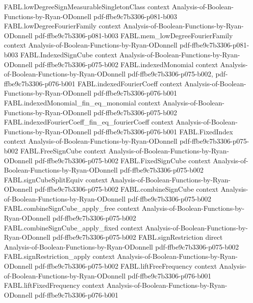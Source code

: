 \begin{theorem}
  {FABL.lowDegreeSignMeasurableSingletonClass}
  {context}
  {Analysis-of-Boolean-Functions-by-Ryan-ODonnell}
  {pdf-ffbe9c7b3306-p081-b003}
\proofstep
  {FABL.lowDegreeFourierFamily}
  {context}
  {Analysis-of-Boolean-Functions-by-Ryan-ODonnell}
  {pdf-ffbe9c7b3306-p081-b003}
\proofstep
  {FABL.mem_lowDegreeFourierFamily}
  {context}
  {Analysis-of-Boolean-Functions-by-Ryan-ODonnell}
  {pdf-ffbe9c7b3306-p081-b003}
\proofstep
  {FABL.IndexedSignCube}
  {context}
  {Analysis-of-Boolean-Functions-by-Ryan-ODonnell}
  {pdf-ffbe9c7b3306-p075-b002}
\proofstep
  {FABL.indexedMonomial}
  {context}
  {Analysis-of-Boolean-Functions-by-Ryan-ODonnell}
  {pdf-ffbe9c7b3306-p075-b002,
    pdf-ffbe9c7b3306-p076-b001}
\proofstep
  {FABL.indexedFourierCoeff}
  {context}
  {Analysis-of-Boolean-Functions-by-Ryan-ODonnell}
  {pdf-ffbe9c7b3306-p076-b001}
\proofstep
  {FABL.indexedMonomial_fin_eq_monomial}
  {context}
  {Analysis-of-Boolean-Functions-by-Ryan-ODonnell}
  {pdf-ffbe9c7b3306-p075-b002}
\proofstep
  {FABL.indexedFourierCoeff_fin_eq_fourierCoeff}
  {context}
  {Analysis-of-Boolean-Functions-by-Ryan-ODonnell}
  {pdf-ffbe9c7b3306-p076-b001}
\proofstep
  {FABL.FixedIndex}
  {context}
  {Analysis-of-Boolean-Functions-by-Ryan-ODonnell}
  {pdf-ffbe9c7b3306-p075-b002}
\proofstep
  {FABL.FreeSignCube}
  {context}
  {Analysis-of-Boolean-Functions-by-Ryan-ODonnell}
  {pdf-ffbe9c7b3306-p075-b002}
\proofstep
  {FABL.FixedSignCube}
  {context}
  {Analysis-of-Boolean-Functions-by-Ryan-ODonnell}
  {pdf-ffbe9c7b3306-p075-b002}
\proofstep
  {FABL.signCubeSplitEquiv}
  {context}
  {Analysis-of-Boolean-Functions-by-Ryan-ODonnell}
  {pdf-ffbe9c7b3306-p075-b002}
\proofstep
  {FABL.combineSignCube}
  {context}
  {Analysis-of-Boolean-Functions-by-Ryan-ODonnell}
  {pdf-ffbe9c7b3306-p075-b002}
\proofstep
  {FABL.combineSignCube_apply_free}
  {context}
  {Analysis-of-Boolean-Functions-by-Ryan-ODonnell}
  {pdf-ffbe9c7b3306-p075-b002}
\proofstep
  {FABL.combineSignCube_apply_fixed}
  {context}
  {Analysis-of-Boolean-Functions-by-Ryan-ODonnell}
  {pdf-ffbe9c7b3306-p075-b002}
\proofstep
  {FABL.signRestriction}
  {direct}
  {Analysis-of-Boolean-Functions-by-Ryan-ODonnell}
  {pdf-ffbe9c7b3306-p075-b002}
\proofstep
  {FABL.signRestriction_apply}
  {context}
  {Analysis-of-Boolean-Functions-by-Ryan-ODonnell}
  {pdf-ffbe9c7b3306-p075-b002}
\proofstep
  {FABL.liftFreeFrequency}
  {context}
  {Analysis-of-Boolean-Functions-by-Ryan-ODonnell}
  {pdf-ffbe9c7b3306-p076-b001}
\proofstep
  {FABL.liftFixedFrequency}
  {context}
  {Analysis-of-Boolean-Functions-by-Ryan-ODonnell}
  {pdf-ffbe9c7b3306-p076-b001}

\end{theorem}
